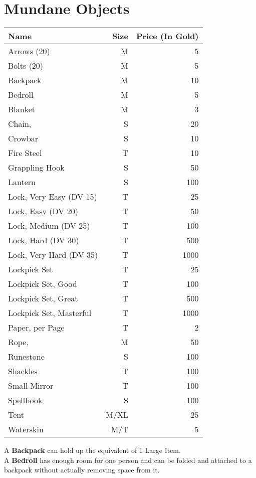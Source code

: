 \onecolumn
\section{Mundane Objects}\label{sec:mundaneObjects}
\begin{longtable}{l | r | r}
	Name & Size & Price (In Gold)\\ \hline
	Arrows (20) & M & 5\\
	Bolts (20) & M & 5\\
	Backpack & M & 10\\
	Bedroll & M & 5\\
	Blanket & M & 3\\
	Chain, \passus{2} & S & 20\\
	Crowbar & S & 10\\
	Fire Steel & T & 10\\
	Grappling Hook & S & 50\\
	Lantern & S & 100\\
	Lock, Very Easy (DV 15) & T & 25\\
	Lock, Easy (DV 20) & T & 50\\
	Lock, Medium (DV 25) & T & 100\\
	Lock, Hard (DV 30) & T & 500\\
	Lock, Very Hard (DV 35) & T & 1000\\
	Lockpick Set & T & 25\\
	Lockpick Set, Good & T & 100\\
	Lockpick Set, Great & T & 500\\
	Lockpick Set, Masterful & T & 1000\\
	Paper, per Page & T & 2\\
	Rope, \passus{10} & M & 50\\
	Runestone & S & 100\\
	Shackles & T & 100\\
	Small Mirror & T & 100\\
	Spellbook & S & 100\\
	Tent & M/XL & 25\\
	Waterskin & M/T & 5\\
\end{longtable}


A \textbf{Backpack} can hold up the equivalent of 1 Large Item.\\

A \textbf{Bedroll} has enough room for one person and can be folded and attached to a backpack without actually removing space from it.\\

